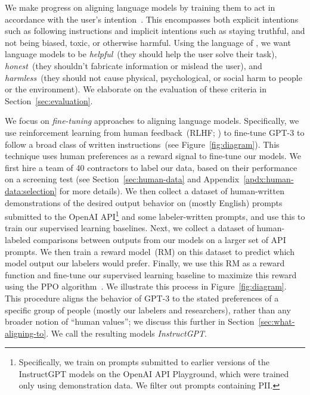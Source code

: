 We make progress on aligning language models by training them to act in accordance with the user's intention~\citep{leike2018scalable}. This encompasses both explicit intentions such as following instructions and implicit intentions such as staying truthful, and not being biased, toxic, or otherwise harmful. Using the language of \citet{askell2021general}, we want language models to be \textit{helpful}~(they should help the user solve their task), \textit{honest}~(they shouldn't fabricate information or mislead the user), and \textit{harmless}~(they should not cause physical, psychological, or social harm to people or the environment). We elaborate on the evaluation of these criteria in Section~\ref{sec:evaluation}.

We focus on \emph{fine-tuning} approaches to aligning language models. Specifically, we use reinforcement learning from human feedback~(RLHF; \citealp{christiano2017deep,stiennon2020learning}) to fine-tune GPT-3 to follow a broad class of written instructions~(see Figure~\ref{fig:diagram}). This technique uses human preferences as a reward signal to fine-tune our models. We first hire a team of 40 contractors to label our data, based on their performance on a screening test (see Section~\ref{sec:human-data} and Appendix~\ref{apdx:human-data:selection} for more details). We then collect a dataset of human-written demonstrations of the desired output behavior on (mostly English) prompts submitted to the OpenAI API\footnote{Specifically, we train on prompts submitted to earlier versions of the InstructGPT models on the OpenAI API Playground, which were trained only using demonstration data. We filter out prompts containing PII.} and some labeler-written prompts, and use this to train our supervised learning baselines. Next, we collect a dataset of human-labeled comparisons between outputs from our models on a larger set of API prompts. We then train a reward model~(RM) on this dataset to predict which model output our labelers would prefer. Finally, we use this RM as a reward function and fine-tune our supervised learning baseline to maximize this reward using the PPO algorithm~\citep{schulman2017proximal}. We illustrate this process in Figure~\ref{fig:diagram}. This procedure aligns the behavior of GPT-3 to the stated preferences of a specific group of people (mostly our labelers and researchers),  rather than any broader notion of ``human values''; we discuss this further in Section~\ref{sec:what-aligning-to}.  We call the resulting models \textit{InstructGPT}. 

